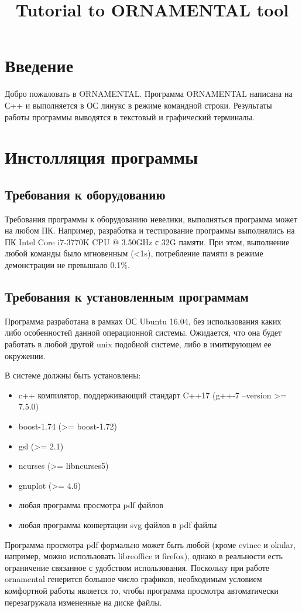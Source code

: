 \documentclass[a4paper]{article}
\begin{document}
\title{Tutorial to ORNAMENTAL tool}

\date{}
\maketitle

\section{Введение}
Добро пожаловать в ORNAMENTAL. Программа ORNAMENTAL написана на С++ и выполняется в ОС линукс в режиме командной строки. Результаты работы программы выводятся в текстовый и графический терминалы.

\section{Инстолляция программы}

\subsection{Требования к оборудованию}
Требования программы к оборудованию невелики, выполняться программа может на любом ПК. Например, разработка и тестирование программы выполнялись на ПК Intel Core i7-3770K CPU @ 3.50GHz с 32G памяти. При этом, выполнение любой команды было мгновенным (<1s), потребление памяти в режиме демонстрации не превышало 0.1\%. 

\subsection{Требования к установленным программам}
Программа разработана в рамках ОС Ubuntu 16.04, без использования каких либо особенностей данной операционной системы. Ожидается, что она будет работать в любой другой unix подобной системе, либо в имитирующем ее окружении.

В системе должны быть установлены:
\begin{itemize}
\item c++ компилятор, поддерживающий стандарт C++17 (g++-7 --version >= 7.5.0)
\item boost-1.74 (>= boost-1.72)
\item gsl (>= 2.1)
\item ncurses (>= libncurses5)
\item gnuplot (>= 4.6)
\item любая программа просмотра pdf файлов
\item любая программа конвертации svg файлов в pdf файлы
\end{itemize}
Программа просмотра pdf формально может быть любой (кроме evince и okular, например, можно использовать libreoffice и firefox), однако в реальности есть ограничение связанное с удобством использования. Поскольку при работе ornamental генерится большое число графиков, необходимым условием комфортной работы является то, чтобы программа просмотра автоматически перезагружала измененные на диске файлы.
\end{document}
